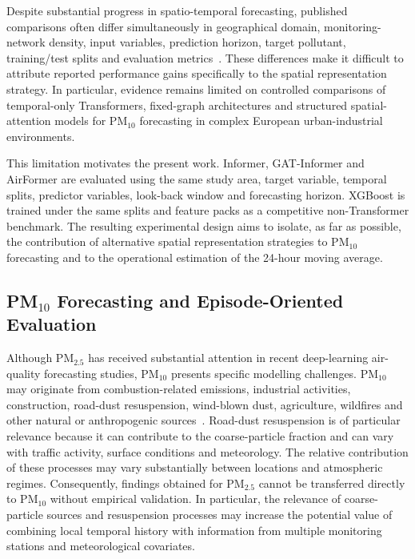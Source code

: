 \documentclass[11pt]{article}
\begin{document}
Despite substantial progress in spatio-temporal forecasting, published comparisons often differ simultaneously in geographical domain, monitoring-network density, input variables, prediction horizon, target pollutant, training/test splits and evaluation metrics~\cite{Agbehadji2024,Chen2024}. These differences make it difficult to attribute reported performance gains specifically to the spatial representation strategy. In particular, evidence remains limited on controlled comparisons of temporal-only Transformers, fixed-graph architectures and structured spatial-attention models for PM$_{10}$ forecasting in complex European urban-industrial environments.

This limitation motivates the present work. Informer, GAT-Informer and AirFormer are evaluated using the same study area, target variable, temporal splits, predictor variables, look-back window and forecasting horizon. XGBoost is trained under the same splits and feature packs as a competitive non-Transformer benchmark. The resulting experimental design aims to isolate, as far as possible, the contribution of alternative spatial representation strategies to PM$_{10}$ forecasting and to the operational estimation of the 24-hour moving average.

\subsection{PM$_{10}$ Forecasting and Episode-Oriented Evaluation}

Although PM$_{2.5}$ has received substantial attention in recent deep-learning air-quality forecasting studies, PM$_{10}$ presents specific modelling challenges. PM$_{10}$ may originate from combustion-related emissions, industrial activities, construction, road-dust resuspension, wind-blown dust, agriculture, wildfires and other natural or anthropogenic sources~\cite{Karagulian2015}. Road-dust resuspension is of particular relevance because it can contribute to the coarse-particle fraction and can vary with traffic activity, surface conditions and meteorology. The relative contribution of these processes may vary substantially between locations and atmospheric regimes. Consequently, findings obtained for PM$_{2.5}$ cannot be transferred directly to PM$_{10}$ without empirical validation. In particular, the relevance of coarse-particle sources and resuspension processes may increase the potential value of combining local temporal history with information from multiple monitoring stations and meteorological covariates.
\end{document}
